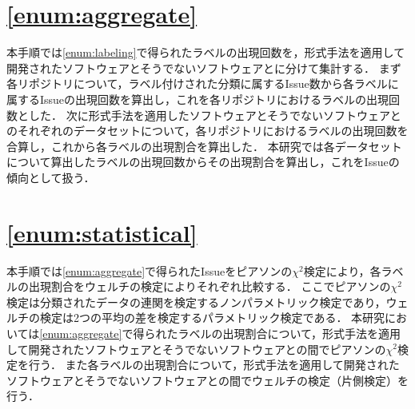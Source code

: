 \documentclass[main]{subfiles}
\begin{document}
\section{\ref{enum:aggregate}}
\label{sec:aggregate}

本手順では\ref{enum:labeling}で得られたラベルの出現回数を，形式手法を適用して開発されたソフトウェアとそうでないソフトウェアとに分けて集計する．
まず各リポジトリについて，ラベル付けされた分類に属するIssue数から各ラベルに属するIssueの出現回数を算出し，これを各リポジトリにおけるラベルの出現回数とした．
次に形式手法を適用したソフトウェアとそうでないソフトウェアとのそれぞれのデータセットについて，各リポジトリにおけるラベルの出現回数を合算し，これから各ラベルの出現割合を算出した．
本研究では各データセットについて算出したラベルの出現回数からその出現割合を算出し，これをIssueの傾向として扱う．

\section{\ref{enum:statistical}}
\label{sec:statistical}

本手順では\ref{enum:aggregate}で得られたIssueをピアソンの\(\chi^2\)検定により，各ラベルの出現割合をウェルチの検定によりそれぞれ比較する．
ここでピアソンの\(\chi^2\)検定は分類されたデータの連関を検定するノンパラメトリック検定であり，ウェルチの検定は2つの平均の差を検定するパラメトリック検定である．
本研究においては\ref{enum:aggregate}で得られたラベルの出現割合について，形式手法を適用して開発されたソフトウェアとそうでないソフトウェアとの間でピアソンの\(\chi^2\)検定を行う．
また各ラベルの出現割合について，形式手法を適用して開発されたソフトウェアとそうでないソフトウェアとの間でウェルチの検定（片側検定）を行う．
\end{document}
